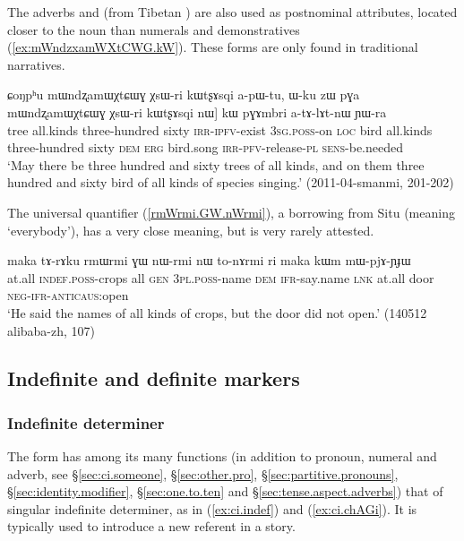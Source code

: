 The adverbs  and  (from Tibetan  ) are also used as postnominal attributes, located closer to the noun than numerals and demonstratives (\ref{ex:mWndzxamWXtCWG.kW}). These forms are only found in traditional narratives.
 
\begin{exe}
\ex \label{ex:mWndzxamWXtCWG.kW}
\gll  ɕoŋpʰu mɯndʐamɯχtɕɯɣ χsɯ-ri kɯtʂɤsqi a-pɯ-tu, ɯ-ku zɯ pɣa mɯndʐamɯχtɕɯɣ χsɯ-ri kɯtʂɤsqi nɯ] kɯ pɣɤmbri a-tɤ-lɤt-nɯ ɲɯ-ra \\
tree all.kinds three-hundred sixty \textsc{irr}-\textsc{ipfv}-exist \textsc{3sg}.\textsc{poss}-on \textsc{loc} bird all.kinds three-hundred sixty \textsc{dem} \textsc{erg} bird.song \textsc{irr}-\textsc{pfv}-release-\textsc{pl} \textsc{sens}-be.needed \\
\glt `May there be three hundred and sixty trees of all kinds, and on them three hundred and sixty bird of all kinds of species singing.' (2011-04-smanmi, 201-202)
\end{exe}

The universal quantifier  (\ref{rmWrmi.GW.nWrmi}), a borrowing from Situ (meaning `everybody'), has a very close meaning, but is very rarely attested.
  
\begin{exe}
\ex \label{rmWrmi.GW.nWrmi}
\gll  maka tɤ-rɤku rmɯrmi ɣɯ nɯ-rmi nɯ to-nɤrmi ri maka kɯm mɯ-pjɤ-ɲɟɯ   \\
at.all \textsc{indef}.\textsc{poss}-crops all \textsc{gen} \textsc{3pl}.\textsc{poss}-name \textsc{dem} \textsc{ifr}-say.name \textsc{lnk} at.all door \textsc{neg}-\textsc{ifr}-\textsc{anticaus}:open \\
\glt `He said the names of all kinds of crops, but the door did not open.' (140512 alibaba-zh, 107)
\end{exe}  

\subsection{Indefinite and definite markers} \label{sec:indefinite.markers}

\subsubsection{Indefinite determiner} \label{sec:indef.article}
The form  has among its many functions (in addition to pronoun, numeral and adverb, see §\ref{sec:ci.someone}, §\ref{sec:other.pro}, §\ref{sec:partitive.pronouns}, §\ref{sec:identity.modifier}, §\ref{sec:one.to.ten} and §\ref{sec:tense.aspect.adverbs}) that of singular indefinite determiner, as in (\ref{ex:ci.indef}) and (\ref{ex:ci.chAGi}). It is typically used to introduce a new referent in a story.

